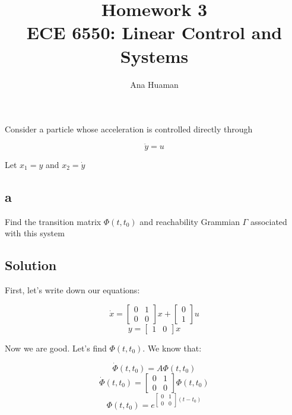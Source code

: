 \documentclass[10pt,a4paper]{article}
\author{Ana Huaman}
\title{\textbf{Homework 3} \\ ECE 6550: Linear Control and Systems}
\date{}
\begin{document}
\maketitle

\section{}
Consider a particle whose acceleration is controlled directly through

\[ \ddot{y} = u \]

Let $x_{1} = y$ and $x_2 = \dot{y}$

\subsection*{a}
Find the transition matrix $\Phi(t,t_{0})$ and reachability Grammian $\Gamma$ associated with this system

\subsection*{Solution}

First, let's write down our equations:

\[ \dot{x} = 
\begin{bmatrix}
0 & 1 \\
0 & 0
\end{bmatrix}
x + 
\begin{bmatrix}
0 \\ 
1
\end{bmatrix}
u
\]
\[ y = \begin{bmatrix}1 & 0\end{bmatrix}x \]

Now we are good. Let's find $\Phi(t, t_{0})$. We know that:

\[ \dot{\Phi}(t,t_{0}) = A\Phi(t,t_{0}) \]
\[ \dot{\Phi}(t,t_{0}) = 
\begin{bmatrix}
0 & 1 \\
0 & 0
\end{bmatrix} \Phi(t, t_{0}) \]
\[ \Phi(t,t_{0})  =  e^{ 
\begin{bmatrix}
0 & 1 \\ 
0 & 0 
\end{bmatrix}(t - t_{0}) } 
\]
\begin{center}
\end{center}
\end{document}
